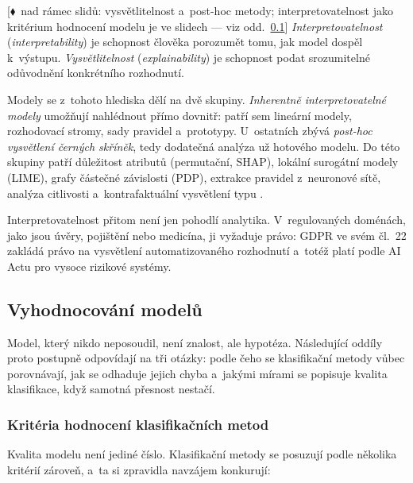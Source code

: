 \documentclass[11pt,a4paper]{article}
\theoremstyle{definition}
\newcommand{\mimoq}[1]{\textcolor{markcol}{\textsf{\footnotesize[$\blacklozenge$~nad rámec slidů: #1]}}}
\begin{document}
\begin{defbox}
\mimoq{vysvětlitelnost a~post-hoc metody; interpretovatelnost jako kritérium hodnocení modelu
je ve slidech --- viz odd.~\ref{ssec:eval}}
\emph{Interpretovatelnost} (\emph{interpretability}) je schopnost člověka porozumět tomu, jak
model dospěl k~výstupu. \emph{Vysvětlitelnost} (\emph{explainability}) je schopnost podat
srozumitelné odůvodnění konkrétního rozhodnutí.

Modely se z~tohoto hlediska dělí na dvě skupiny. \emph{Inherentně interpretovatelné modely}
umožňují nahlédnout přímo dovnitř: patří sem lineární modely, rozhodovací stromy, sady pravidel
a~prototypy. U~ostatních zbývá \emph{post-hoc vysvětlení černých skříněk}, tedy dodatečná
analýza už hotového modelu. Do této skupiny patří důležitost atributů (permutační, SHAP),
lokální surogátní modely (LIME), grafy částečné závislosti (PDP), extrakce pravidel
z~neuronové sítě, analýza citlivosti a~kontrafaktuální vysvětlení typu .

Interpretovatelnost přitom není jen pohodlí analytika. V~regulovaných doménách, jako jsou
úvěry, pojištění nebo medicína, ji vyžaduje právo: GDPR ve svém čl.~22 zakládá právo na
vysvětlení automatizovaného rozhodnutí a~totéž platí podle AI Actu pro vysoce rizikové systémy.
\end{defbox}

\subsection{Vyhodnocování modelů}
\label{ssec:eval}

Model, který nikdo neposoudil, není znalost, ale hypotéza. Následující oddíly proto postupně
odpovídají na tři otázky: podle čeho se klasifikační metody vůbec porovnávají, jak se odhaduje
jejich chyba a~jakými mírami se popisuje kvalita klasifikace, když samotná přesnost nestačí.

\subsubsection{Kritéria hodnocení klasifikačních metod}

Kvalita modelu není jediné číslo. Klasifikační metody se posuzují podle několika kritérií
zároveň, a~ta si zpravidla navzájem konkurují:
\end{document}
